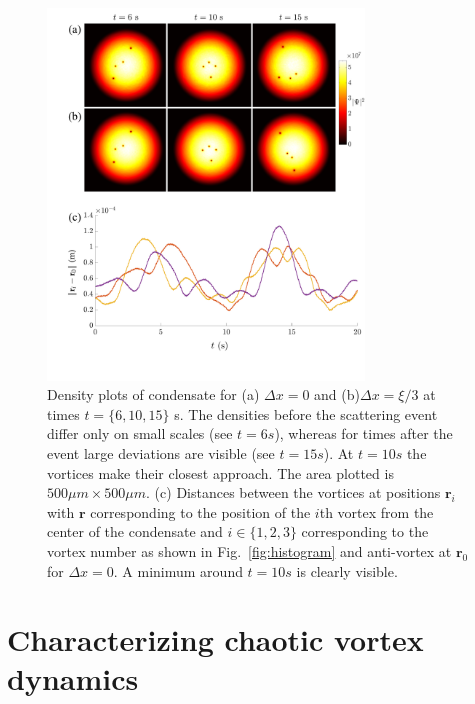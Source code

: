 \begin{figure}
\center \includegraphics[width=0.75\textwidth]{data/2d/snapshots/snapshots}

\caption{
Density plots of condensate for (a) $\Delta x = 0$ and (b)$\Delta x=\xi/3$ at times $t=\{6,10,15\}$ s. The densities before the scattering event differ only on small scales (see $t=6s$), whereas for times after the event large deviations are visible (see $t=15s$).
At $t=10s$ the vortices make their closest approach. The area plotted is $500 \mu m\times 500 \mu m$.
(c) Distances between the vortices at positions $\mathbf{r}_i$ with $\mathbf{r}$ corresponding to the position of the $i$th vortex from the center of the condensate and $i\in \{1,2,3\}$ corresponding to the vortex number as shown in Fig.~\ref{fig:histogram} and anti-vortex at $\mathbf{r}_0$ for $\Delta x = 0$.
A minimum around $t=10s$ is clearly visible.
}
\label{fig:snapshots}
\end{figure}

\section{Characterizing chaotic vortex dynamics}

